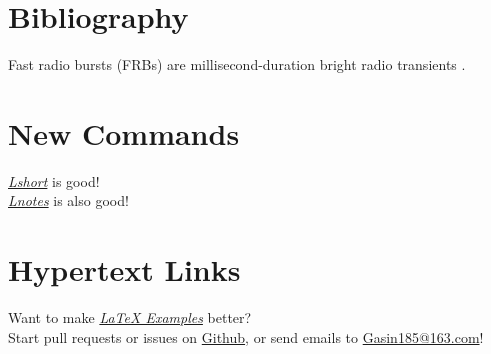 \documentclass{article}
\begin{document}
    \section{Bibliography}
    Fast radio bursts (FRBs) are millisecond-duration bright radio transients
    \cite{Li2018,Lin2020}.
    
    
    \section{New Commands}
    \def\lshortURL{https://www.ctan.org/pkg/lshort}
    \def\lnotesURL{https://github.com/huangxg/lnotes}
    \newcommand{\isgood}[3][good]{\href{#3}{\emph{#2}} is #1!}
    \isgood{Lshort}{\lshortURL}\\
    \isgood[also good]{Lnotes}{\lnotesURL}
    \section{Hypertext Links}
    Want to make \href{lexample.pdf}{\emph{\LaTeX{} Examples}} better?\\
    Start pull requests or issues on
    \href{https://github.com/GasinAn/lexamples}{Github},
    or send emails to
    \href{mailto:Gasin185@163.com}{Gasin185@163.com}!
\end{document}
